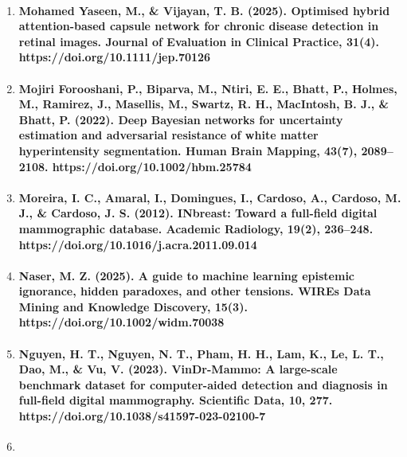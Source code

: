 \begin{enumerate}
  \paragraph{McKinney, S. M., Sieniek, M., Godbole, V., Godwin, J., Antropova, N., Ashrafian, H., Back, T., Chesus, M., Corrado, G. S., Darzi, A., Etemadi, M., Garcia-Vicente, F., Gilbert, F. J., Halling-Brown, M., Hassabis, D., Jansen, S., Karthikesalingam, A., Kelly, C. J., King, D., \& Shetty, S. (2020). International evaluation of an AI system for breast cancer screening. Nature, 577(7788), 89–94. https://doi.org/10.1038/s41586-019-1799-6}
\item
  \paragraph{Mohamed Yaseen, M., \& Vijayan, T. B. (2025). Optimised hybrid attention-based capsule network for chronic disease detection in retinal images. Journal of Evaluation in Clinical Practice, 31(4). https://doi.org/10.1111/jep.70126}
\item
  \paragraph{Mojiri Forooshani, P., Biparva, M., Ntiri, E. E., Bhatt, P., Holmes, M., Ramirez, J., Masellis, M., Swartz, R. H., MacIntosh, B. J., \& Bhatt, P. (2022). Deep Bayesian networks for uncertainty estimation and adversarial resistance of white matter hyperintensity segmentation. Human Brain Mapping, 43(7), 2089–2108. https://doi.org/10.1002/hbm.25784}
\item
  \paragraph{Moreira, I. C., Amaral, I., Domingues, I., Cardoso, A., Cardoso, M. J., \& Cardoso, J. S. (2012). INbreast: Toward a full-field digital mammographic database. Academic Radiology, 19(2), 236–248. https://doi.org/10.1016/j.acra.2011.09.014}
\item
  \paragraph{Naser, M. Z. (2025). A guide to machine learning epistemic ignorance, hidden paradoxes, and other tensions. WIREs Data Mining and Knowledge Discovery, 15(3). https://doi.org/10.1002/widm.70038}
\item
  \paragraph{Nguyen, H. T., Nguyen, N. T., Pham, H. H., Lam, K., Le, L. T., Dao, M., \& Vu, V. (2023). VinDr-Mammo: A large-scale benchmark dataset for computer-aided detection and diagnosis in full-field digital mammography. Scientific Data, 10, 277. https://doi.org/10.1038/s41597-023-02100-7}
\item

\end{enumerate}
